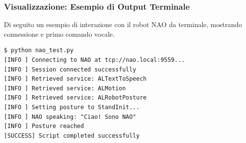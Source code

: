 \subsubsection{Visualizzazione: Esempio di Output Terminale}
Di seguito un esempio di interazione con il robot NAO da terminale, mostrando connessione e primo comando vocale.

\begin{tcolorbox}[title=Output Terminale - Prima Connessione]
\begin{verbatim}
$ python nao_test.py
[INFO ] Connecting to NAO at tcp://nao.local:9559...
[INFO ] Session connected successfully
[INFO ] Retrieved service: ALTextToSpeech
[INFO ] Retrieved service: ALMotion
[INFO ] Retrieved service: ALRobotPosture
[INFO ] Setting posture to StandInit...
[INFO ] NAO speaking: "Ciao! Sono NAO"
[INFO ] Posture reached
[SUCCESS] Script completed successfully
\end{verbatim}
\end{tcolorbox}

